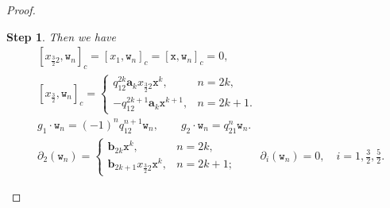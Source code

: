 \documentclass[10pt,a4paper]{amsart}
\numberwithin{equation}{section}
\newtheorem{stepiv}{Step}
\newcommand{\ab}{\mathbf a}
\newcommand{\bb}{\mathbf b}
\newcommand{\wt}{\mathtt{w}}
\newcommand{\xt}{\mathtt{x}}
\newcommand{\tresdos}{\frac{3}{2}}
\begin{document}
\begin{proof}
\begin{stepiv}
Then we have
\begin{align}
\label{eq:pale+Jordan-wn-adj-action}
&[x_{\tresdos2},\wt_n]_c= [x_1,\wt_n]_c =[\xt,\wt_n]_c =0,
\\
\label{eq:pale+Jordan-wn-adj-action-2}
&[x_{\tresdos},\wt_n]_c= \begin{cases}
q_{12}^{2k} \ab_k x_{\tresdos2}\xt^{k}, & n=2k, \\
-q_{12}^{2k+1}\ab_k \xt^{k+1}, & n=2k+1.
\end{cases}
\\
\label{eq:pale+Jordan-action-wn}
&g_1\cdot \wt_n =(-1)^n q_{12}^{n+1} \wt_n, \qquad
g_2\cdot \wt_n = q_{21}^{n} \wt_n.
\\
\label{eq:pale+Jordan-derivations-wn}
&\partial_{2}(\wt_n)=\begin{cases}
\bb_{2k} \xt^{k}, & n=2k, \\
\bb_{2k+1} x_{\tresdos2}\xt^{k}, & n=2k+1;
\end{cases} \qquad \partial_{i}(\wt_n) =0, \quad i=1,\tfrac{3}{2},\tfrac{5}{2}.
\end{align}
\end{stepiv}


\end{proof}
\end{document}
